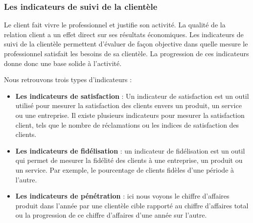             \subsubsection[Les indicateurs de suivi de la clientèles]{Les indicateurs de suivi de la clientèle}
            Le client fait vivre le professionnel et justifie son activité.
            La qualité de la relation client a un effet direct sur ses résultats économiques.
            Les indicateurs de suivi de la clientèle permettent d’évaluer de façon
            objective dans quelle mesure le professionnel satisfait les besoins
            de sa clientèle. La progression de ces indicateurs donne donc une base solide à l’activité.
            \par
            Nous retrouvons trois types d’indicateurs :
            \par
            \begin{itemize}
                \setlength{\itemsep}{0pt}
                \item [\ding{226}] \textbf{Les indicateurs de satisfaction} :
                Un indicateur de satisfaction est un outil utilisé pour mesurer
                la satisfaction des clients envers un produit, un service ou une
                entreprise. Il existe plusieurs indicateurs pour mesurer la
                satisfaction client, tels que le nombre de réclamations ou
                les indices de satisfaction des clients.
                \item [\ding{226}] \textbf{Les indicateurs de fidélisation} :
                un indicateur de fidélisation est un outil qui permet de mesurer
                la fidélité des clients à une entreprise, un produit ou un service.
                Par exemple, le pourcentage de clients fidèles d’une période à l’autre.
                \item [\ding{226}] \textbf{Les indicateurs de pénétration} :
                ici nous voyons le chiffre d’affaires produit dans l’année
                par une clientèle cible rapporté au chiffre d’affaires total
                ou la progression de ce chiffre d’affaires d’une année sur l’autre.
            \end{itemize}
